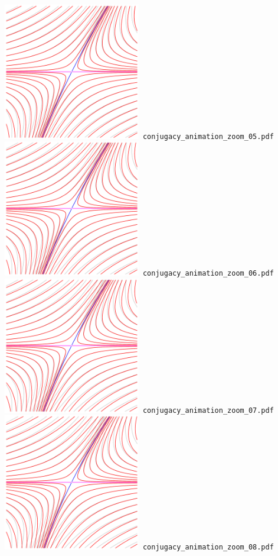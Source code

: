 \documentclass[a4paper]{amsart}
\begin{document}
\includegraphics[width=6cm]{conjugacy_animation_zoom_05.pdf}\verb+ conjugacy_animation_zoom_05.pdf+\\
\includegraphics[width=6cm]{conjugacy_animation_zoom_06.pdf}\verb+ conjugacy_animation_zoom_06.pdf+\\
\includegraphics[width=6cm]{conjugacy_animation_zoom_07.pdf}\verb+ conjugacy_animation_zoom_07.pdf+\\
\includegraphics[width=6cm]{conjugacy_animation_zoom_08.pdf}\verb+ conjugacy_animation_zoom_08.pdf+\\
\end{document}
